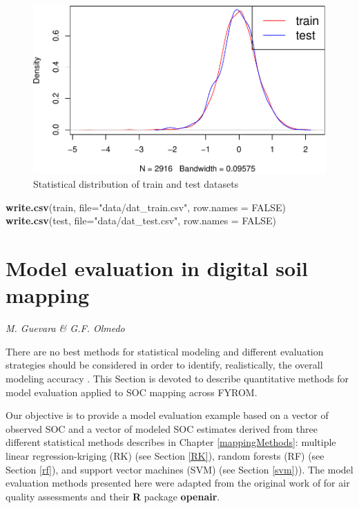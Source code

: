 \documentclass[10pt,b5paper,]{book}
\newenvironment{Shaded}{\begin{snugshade}}{\end{snugshade}}
\newcommand{\DataTypeTok}[1]{\textcolor[rgb]{0.13,0.29,0.53}{#1}}
\newcommand{\KeywordTok}[1]{\textcolor[rgb]{0.13,0.29,0.53}{\textbf{#1}}}
\newcommand{\NormalTok}[1]{#1}
\newcommand{\OtherTok}[1]{\textcolor[rgb]{0.56,0.35,0.01}{#1}}
\newcommand{\StringTok}[1]{\textcolor[rgb]{0.31,0.60,0.02}{#1}}
\theoremstyle{definition}
\theoremstyle{definition}
\theoremstyle{definition}
\theoremstyle{remark}
\begin{document}
\begin{figure}
\centering
\includegraphics{SOCMapping_files/figure-latex/unnamed-chunk-92-1.pdf}
\caption{\label{fig:unnamed-chunk-92}Statistical distribution of train and
test datasets}
\end{figure}

\begin{Shaded}
\begin{Highlighting}[]
\KeywordTok{write.csv}\NormalTok{(train, }\DataTypeTok{file=}\StringTok{"data/dat_train.csv"}\NormalTok{, }\DataTypeTok{row.names =} \OtherTok{FALSE}\NormalTok{)}
\KeywordTok{write.csv}\NormalTok{(test, }\DataTypeTok{file=}\StringTok{"data/dat_test.csv"}\NormalTok{, }\DataTypeTok{row.names =} \OtherTok{FALSE}\NormalTok{)}
\end{Highlighting}
\end{Shaded}

\hypertarget{evaluation}{%
\chapter{Model evaluation in digital soil mapping}\label{evaluation}}

\emph{M. Guevara \& G.F. Olmedo}

There are no best methods for statistical modeling and different
evaluation strategies should be considered in order to identify,
realistically, the overall modeling accuracy
\citep{ho2002simple, qiao2015no, guevara_2018, nussbaum2018evaluation}.
This Section is devoted to describe quantitative methods for model
evaluation applied to SOC mapping across FYROM.

Our objective is to provide a model evaluation example based on a vector
of observed SOC and a vector of modeled SOC estimates derived from three
different statistical methods describes in Chapter \ref{mappingMethods}:
multiple linear regression-kriging (RK) (see Section \ref{RK}), random
forests (RF) (see Section \ref{rf}), and support vector machines (SVM)
(see Section \ref{svm})). The model evaluation methods presented here
were adapted from the original work of \citet{openair} for air quality
assessments and their \textbf{R} package \textbf{openair}.
\end{document}
